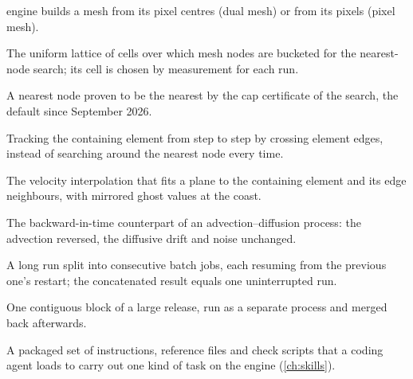 \begin{description}[style=nextline,leftmargin=0pt,font=\normalfont\bfseries]
  engine builds a mesh from its pixel centres (dual mesh) or from its pixels (pixel mesh).
\item[Grid hash] The uniform lattice of cells over which mesh nodes are bucketed for the nearest-node
  search; its cell is chosen by measurement for each run.
\item[Exact anchor] A nearest node proven to be the nearest by the cap certificate of the search, the
  default since September 2026.
\item[Edge walk] Tracking the containing element from step to step by crossing element edges, instead of
  searching around the nearest node every time.
\item[Edge least squares] The velocity interpolation that fits a plane to the containing element and its
  edge neighbours, with mirrored ghost values at the coast.
\item[Adjoint process] The backward-in-time counterpart of an advection--diffusion process: the advection
  reversed, the diffusive drift and noise unchanged.
\item[Resumable chain] A long run split into consecutive batch jobs, each resuming from the previous one's
  restart; the concatenated result equals one uninterrupted run.
\item[Shard] One contiguous block of a large release, run as a separate process and merged back afterwards.
\item[Agent skill] A packaged set of instructions, reference files and check scripts that a coding agent
  loads to carry out one kind of task on the engine (\cref{ch:skills}).
\end{description}
